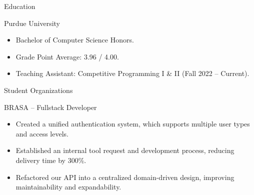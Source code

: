 \documentclass[]{article}
\newlength{\tabin}
\newlength{\secsep}
\newcommand{\lineunder}{\vspace*{-8pt} \\ \hspace*{-6pt} \hrulefill \\ \vspace*{-15pt}}
\newenvironment{tabbedsection}[1]{
  \begin{list}{}{
      \setlength{\itemsep}{0pt}
      \setlength{\labelsep}{0pt}
      \setlength{\labelwidth}{0pt}
      \setlength{\leftmargin}{\tabin}
      \setlength{\rightmargin}{\tabin}
      \setlength{\listparindent}{0pt}
      \setlength{\parsep}{0pt}
      \setlength{\parskip}{0pt}
      \setlength{\partopsep}{0pt}
      \setlength{\topsep}{#1}
    }
  \item[]
}{\end{list}}
\newenvironment{resume_section}[1]{
  \filbreak
  \vspace{2\secsep}
  \textsc{\large#1}
  \lineunder
  \begin{tabbedsection}{\secsep}
}{\end{tabbedsection}}
\newenvironment{resume_subsection}[2][]{
  \textbf{#2} \hfill {\footnotesize #1} \hspace{2em}
  \begin{tabbedsection}{0.5\secsep}
}{\end{tabbedsection}}
\newenvironment{subitems}{
  \renewcommand{\labelitemi}{-}
  \begin{itemize}
      \setlength{\labelsep}{1em}
}{\end{itemize}}
\begin{document}

\begin{resume_section}{Education}

	\begin{resume_subsection}{Purdue University}

		\begin{subitems}

			\item Bachelor of Computer Science Honors.

			\item Grade Point Average: 3.96 / 4.00.

			\item Teaching Assistant: Competitive Programming I \& II (Fall 2022 -- Current).

		\end{subitems}

	\end{resume_subsection}

\end{resume_section}


\begin{resume_section}{Student Organizations}

	\begin{resume_subsection}[Remote (2021.08 -- 2022.08)]{BRASA -- Fullstack Developer}

		\begin{subitems}

			\item Created a unified authentication system, which supports multiple user types and
			access levels.

			\item Established an internal tool request and development process, reducing delivery
			time by 300\%.

			\item Refactored our API into a centralized domain-driven design, improving
			maintainability and expandability.

		\end{subitems}

	\end{resume_subsection}

\end{resume_section}
\end{document}
